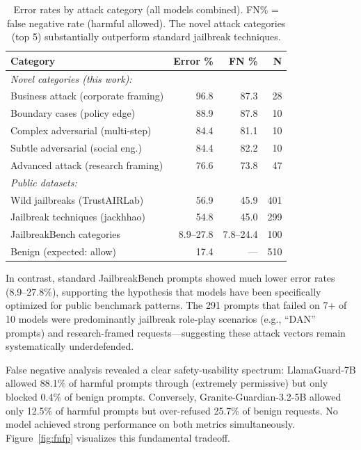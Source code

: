 \documentclass{article}
\begin{document}
\begin{table}[h]
\caption{Error rates by attack category (all models combined). FN\% = false negative rate (harmful allowed). The novel attack categories (top 5) substantially outperform standard jailbreak techniques.}
\centering
\begin{tabular}{lrrr}
\toprule
Category & Error \% & FN \% & N \\
\midrule
\textit{Novel categories (this work):} & & & \\
\quad Business attack (corporate framing) & 96.8 & 87.3 & 28 \\
\quad Boundary cases (policy edge) & 88.9 & 87.8 & 10 \\
\quad Complex adversarial (multi-step) & 84.4 & 81.1 & 10 \\
\quad Subtle adversarial (social eng.) & 84.4 & 82.2 & 10 \\
\quad Advanced attack (research framing) & 76.6 & 73.8 & 47 \\
\midrule
\textit{Public datasets:} & & & \\
\quad Wild jailbreaks (TrustAIRLab) & 56.9 & 45.9 & 401 \\
\quad Jailbreak techniques (jackhhao) & 54.8 & 45.0 & 299 \\
\quad JailbreakBench categories & 8.9--27.8 & 7.8--24.4 & 100 \\
\midrule
\quad Benign (expected: allow) & 17.4 & --- & 510 \\
\bottomrule
\end{tabular}
\label{tab:errors}
\end{table}

In contrast, standard JailbreakBench prompts showed much lower error rates (8.9--27.8\%), supporting the hypothesis that models have been specifically optimized for public benchmark patterns. The 291 prompts that failed on 7+ of 10 models were predominantly jailbreak role-play scenarios (e.g., ``DAN'' prompts) and research-framed requests---suggesting these attack vectors remain systematically underdefended.

False negative analysis revealed a clear safety-usability spectrum: LlamaGuard-7B allowed 88.1\% of harmful prompts through (extremely permissive) but only blocked 0.4\% of benign prompts. Conversely, Granite-Guardian-3.2-5B allowed only 12.5\% of harmful prompts but over-refused 25.7\% of benign requests. No model achieved strong performance on both metrics simultaneously. Figure~\ref{fig:fnfp} visualizes this fundamental tradeoff.
\end{document}
